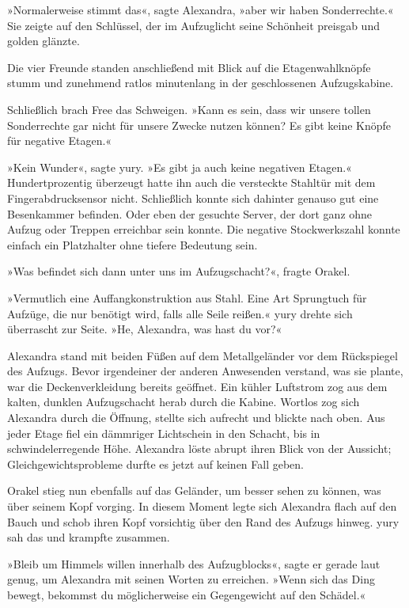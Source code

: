 »Normalerweise stimmt das«, sagte Alexandra, »aber wir haben Sonderrechte.« Sie zeigte auf den Schlüssel, der im Aufzuglicht seine Schönheit preisgab und golden glänzte.

Die vier Freunde standen anschließend mit Blick auf die Etagenwahlknöpfe stumm und zunehmend ratlos minutenlang in der geschlossenen Aufzugskabine.

Schließlich brach Free das Schweigen. »Kann es sein, dass wir unsere tollen Sonderrechte gar nicht für unsere Zwecke nutzen können? Es gibt keine Knöpfe für negative Etagen.«

»Kein Wunder«, sagte yury. »Es gibt ja auch keine negativen Etagen.« Hundertprozentig überzeugt hatte ihn auch die versteckte Stahltür mit dem Fingerabdrucksensor nicht. Schließlich konnte sich dahinter genauso gut eine Besenkammer befinden. Oder eben der gesuchte Server, der dort ganz ohne Aufzug oder Treppen erreichbar sein konnte. Die negative Stockwerkszahl konnte einfach ein Platzhalter ohne tiefere Bedeutung sein.

»Was befindet sich dann unter uns im Aufzugschacht?«, fragte Orakel.

»Vermutlich eine Auffangkonstruktion aus Stahl. Eine Art Sprungtuch für Aufzüge, die nur benötigt wird, falls alle Seile reißen.« yury drehte sich überrascht zur Seite. »He, Alexandra, was hast du vor?«

Alexandra stand mit beiden Füßen auf dem Metallgeländer vor dem Rückspiegel des Aufzugs. Bevor irgendeiner der anderen Anwesenden verstand, was sie plante, war die Deckenverkleidung bereits geöffnet. Ein kühler Luftstrom zog aus dem kalten, dunklen Aufzugschacht herab durch die Kabine. Wortlos zog sich Alexandra durch die Öffnung, stellte sich aufrecht und blickte nach oben. Aus jeder Etage fiel ein dämmriger Lichtschein in den Schacht, bis in schwindelerregende Höhe. Alexandra löste abrupt ihren Blick von der Aussicht; Gleichgewichtsprobleme durfte es jetzt auf keinen Fall geben.

Orakel stieg nun ebenfalls auf das Geländer, um besser sehen zu können, was über seinem Kopf vorging. In diesem Moment legte sich Alexandra flach auf den Bauch und schob ihren Kopf vorsichtig über den Rand des Aufzugs hinweg. yury sah das und krampfte zusammen.

»Bleib um Himmels willen innerhalb des Aufzugblocks«, sagte er gerade laut genug, um Alexandra mit seinen Worten zu erreichen. »Wenn sich das Ding bewegt, bekommst du möglicherweise ein Gegengewicht auf den Schädel.«

